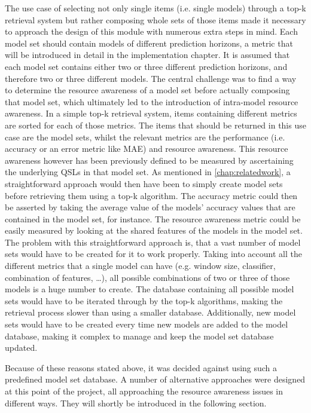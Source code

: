 The use case of selecting not only single items (i.e. single models) through a top-k retrieval system but rather composing whole sets of those items made it necessary to approach the design of this module with numerous extra steps in mind. Each model set should contain models of different prediction horizons, a metric that will be introduced in detail in the implementation chapter. It is assumed that each model set contains either two or three different prediction horizons, and therefore two or three different models. The central challenge was to find a way to determine the resource awareness of a model set before actually composing that model set, which ultimately led to the introduction of intra-model resource awareness. In a simple top-k retrieval system, items containing different metrics are sorted for each of those metrics. The items that should be returned in this use case are the model sets, whilst the relevant metrics are the performance (i.e. accuracy or an error metric like MAE) and resource awareness. This resource awareness however has been previously defined to be measured by ascertaining the underlying QSLs in that model set. As mentioned in \autoref{chap:relatedwork}, a straightforward approach would then have been to simply create model sets before retrieving them using a top-k algorithm. The accuracy metric could then be asserted by taking the average value of the models’ accuracy values that are contained in the model set, for instance. The resource awareness metric could be easily measured by looking at the shared features of the models in the model set. The problem with this straightforward approach is, that a vast number of model sets would have to be created for it to work properly. Taking into account all the different metrics that a single model can have (e.g. window size, classifier, combination of features, …), all possible combinations of two or three of those models is a huge number to create. The database containing all possible model sets would have to be iterated through by the top-k algorithms, making the retrieval process slower than using a smaller database. Additionally, new model sets would have to be created every time new models are added to the model database, making it complex to manage and keep the model set database updated. 

Because of these reasons stated above, it was decided against using such a predefined model set database. A number of alternative approaches were designed at this point of the project, all approaching the resource awareness issues in different ways. They will shortly be introduced in the following section. 

